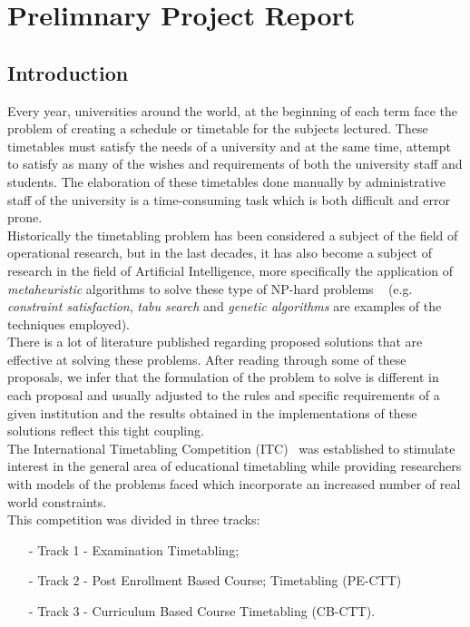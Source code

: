 \chapter{Prelimnary Project Report}
\label{introduction}
\thispagestyle{plain}
\section{Introduction}
Every year, universities around the world, at the beginning of each term face the problem of creating a schedule or timetable for the subjects lectured. These timetables must satisfy the needs of a university and at the same time, attempt to satisfy as many of the wishes and requirements of both the university staff and students. The elaboration of these timetables done manually by administrative staff of the university is a time-consuming task which is both difficult and error prone. \\
Historically the timetabling problem has been considered a subject of the field of operational research, but in the last decades, it has also become a subject of research in the field of Artificial Intelligence, more specifically the application of \emph{metaheuristic} algorithms to solve these type of NP-hard problems ~\cite{Cooper1996, Even1976} (e.g. \emph{constraint satisfaction}, \emph{tabu search} and \emph{genetic algorithms} are examples of the techniques employed). \\
There is a lot of literature published regarding proposed solutions that are effective at solving these problems. After reading through some of these proposals, we infer that the formulation of the problem to solve is different in each proposal and usually adjusted to the rules and specific requirements of a given institution and the results obtained in the implementations of these solutions reflect this tight coupling. \\
The International Timetabling Competition (ITC)~\cite{McCollum} was established to stimulate interest in the general area of educational timetabling while providing researchers with models of the problems faced which incorporate an increased number of real world constraints.\\
This competition was divided in three tracks:
\begin{itemize}
\item[-] Track 1 - Examination Timetabling;
\item[-] Track 2 - Post Enrollment Based Course; Timetabling (PE-CTT)
\item[-] Track 3 - Curriculum Based Course Timetabling (CB-CTT).
\end{itemize}
